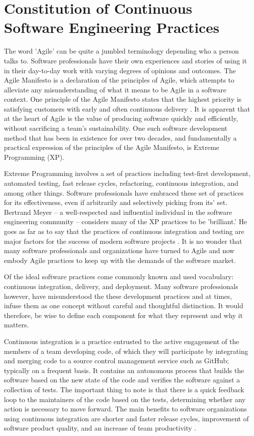 \documentclass[12pt,a4paper]{article}
\begin{document}
\section{Constitution of Continuous Software Engineering Practices}
The word 'Agile' can be quite a jumbled terminology depending who a person talks to. Software professionals have their own experiences and stories of using it in their day-to-day work with varying degrees of opinions and outcomes. The Agile Manifesto is a declaration of the principles of Agile, which attempts to alleviate any misunderstanding of what it means to be Agile in a software context. One principle of the Agile Manifesto states that the highest priority is satisfying customers with early and often continuous delivery \cite[p. ~50]{meyer_2014}. It is apparent that at the heart of Agile is the value of producing software quickly and efficiently, without sacrificing a team's sustainability. One such software development method that has been in existence for over two decades, and fundamentally a practical expression of the principles of the Agile Manifesto, is Extreme Programming (XP). 

Extreme Programming involves a set of practices including test-first development, automated testing, fast release cycles, refactoring, continuous integration, and among other things. Software professionals have embraced these set of practices for its effectiveness, even if arbitrarily and selectively picking from its' set. Bertrand Meyer -- a well-respected and influential individual in the software engineering community -- considers many of the XP practices to be 'brilliant.' He goes as far as to say that the practices of continuous integration and testing are major factors for the success of modern software projects \cite[p. ~154]{meyer_2014}. It is no wonder that many software professionals and organizations have turned to Agile and now embody Agile practices to keep up with the demands of the software market.

Of the ideal software practices come commonly known and used vocabulary: continuous integration, delivery, and deployment. Many software professionals however, have misunderstood the these development practices and at times, infuse them as one concept without careful and thoughtful distinction. It would therefore, be wise to define each component for what they represent and why it matters.

Continuous integration is a practice entrusted to the active engagement of the members of a team developing code, of which they will participate by integrating and merging code to a source control management service such as GitHub; typically on a frequent basis. It contains an autonomous process that builds the software based on the new state of the code and verifies the software against a collection of tests. The important thing to note is that there is a quick feedback loop to the maintainers of the code based on the tests, determining whether any action is necessary to move forward. The main benefits to software organizations using continuous integration are shorter and faster release cycles, improvement of software product quality, and an increase of team productivity \cite[p. ~3910]{shahin_babar_zhu_2017}.
\end{document}
